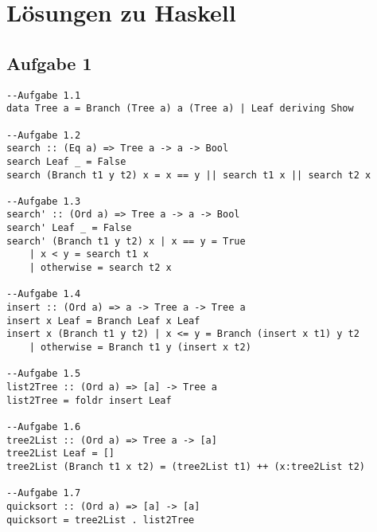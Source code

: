 \documentclass{scrartcl}
\begin{document}
\lstset{language=Haskell}
\section*{Lösungen zu Haskell}
\subsection*{Aufgabe 1}
\begin{lstlisting}
--Aufgabe 1.1
data Tree a = Branch (Tree a) a (Tree a) | Leaf deriving Show

--Aufgabe 1.2
search :: (Eq a) => Tree a -> a -> Bool
search Leaf _ = False
search (Branch t1 y t2) x = x == y || search t1 x || search t2 x

--Aufgabe 1.3
search' :: (Ord a) => Tree a -> a -> Bool
search' Leaf _ = False
search' (Branch t1 y t2) x | x == y = True
    | x < y = search t1 x
    | otherwise = search t2 x

--Aufgabe 1.4
insert :: (Ord a) => a -> Tree a -> Tree a
insert x Leaf = Branch Leaf x Leaf
insert x (Branch t1 y t2) | x <= y = Branch (insert x t1) y t2
    | otherwise = Branch t1 y (insert x t2)

--Aufgabe 1.5
list2Tree :: (Ord a) => [a] -> Tree a
list2Tree = foldr insert Leaf

--Aufgabe 1.6
tree2List :: (Ord a) => Tree a -> [a]
tree2List Leaf = []
tree2List (Branch t1 x t2) = (tree2List t1) ++ (x:tree2List t2)

--Aufgabe 1.7
quicksort :: (Ord a) => [a] -> [a]
quicksort = tree2List . list2Tree
\end{lstlisting}
\end{document}
